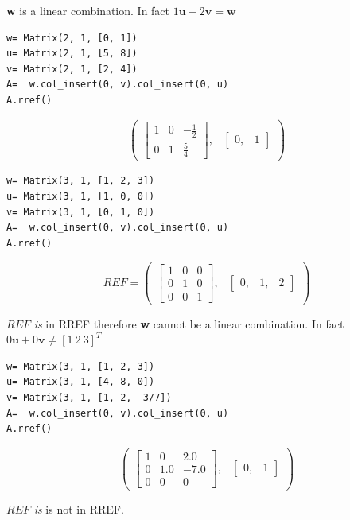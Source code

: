 \documentclass[a4paper]{article}
\begin{document}
\textbf{w} is a linear combination. In fact $1\mathbf{u} -2\mathbf{v}= \mathbf{w}$

\begin{verbatim}
w= Matrix(2, 1, [0, 1])
u= Matrix(2, 1, [5, 8])
v= Matrix(2, 1, [2, 4])
A=  w.col_insert(0, v).col_insert(0, u)
A.rref()
\end{verbatim}

\begin{equation}\label{eq:}
\begin{pmatrix}\left[\begin{matrix}1 & 0 & - \frac{1}{2}\\0 & 1 & \frac{5}{4}\end{matrix}\right], & \begin{bmatrix}0, & 1\end{bmatrix}\end{pmatrix}
\end{equation}

\begin{verbatim}
w= Matrix(3, 1, [1, 2, 3])
u= Matrix(3, 1, [1, 0, 0])
v= Matrix(3, 1, [0, 1, 0])
A=  w.col_insert(0, v).col_insert(0, u)
A.rref()
\end{verbatim}

\begin{equation}
REF= \begin{pmatrix}\left[\begin{matrix}1 & 0 & 0\\0 & 1 & 0\\0 & 0 & 1\end{matrix}\right], & \begin{bmatrix}0, & 1, & 2\end{bmatrix}\end{pmatrix}
\end{equation}

$REF$ \emph{is} in RREF therefore \textbf{w} cannot be a linear combination. In fact
$0\mathbf{u} + 0\mathbf{v} \neq [1\ 2\ 3]^T$

\begin{verbatim}
w= Matrix(3, 1, [1, 2, 3])
u= Matrix(3, 1, [4, 8, 0])
v= Matrix(3, 1, [1, 2, -3/7])
A=  w.col_insert(0, v).col_insert(0, u)
A.rref()
\end{verbatim}

\begin{equation}\label{eq:}
\begin{pmatrix}\left[\begin{matrix}1 & 0 & 2.0\\0 & 1.0 & -7.0\\0 & 0 & 0\end{matrix}\right], & \begin{bmatrix}0, & 1\end{bmatrix}\end{pmatrix}
\end{equation}

$REF$ \emph{is} is not in RREF.

\end{document}

